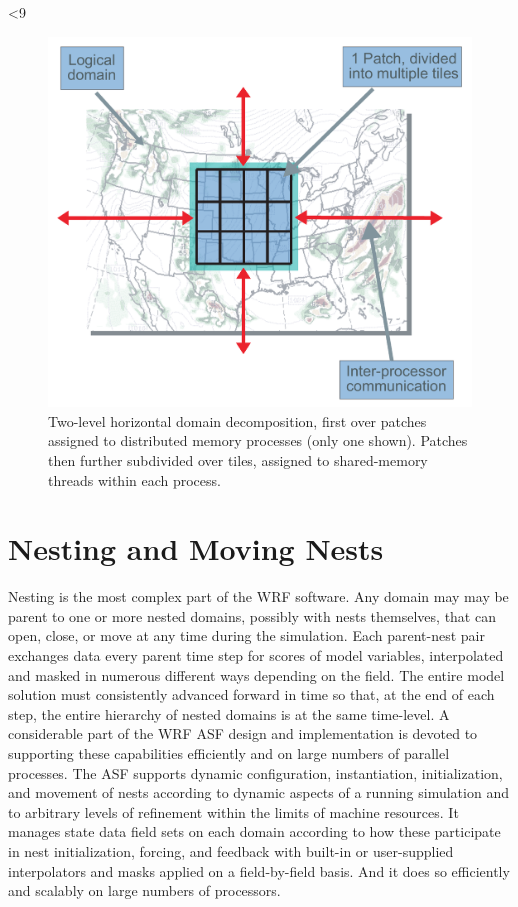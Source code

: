 %
%
\ifnum{}<9
\begin{figure}
  \centering
  \includegraphics[width=6.5in]{figures/tile_patch.pdf}
  \caption{\label{figure:decomposition}Two-level horizontal domain decomposition, first over patches assigned to
distributed memory processes (only one shown). Patches then further subdivided over tiles, assigned to shared-memory threads
within each process.}
\end{figure}
\fi

\section{Nesting and Moving Nests}
\label{arch:2}

Nesting is the most complex
part of the WRF software.  Any domain may may be
parent to one or more nested domains, possibly with nests themselves, that can open, close, or move
at any time during the simulation.  Each
parent-nest pair exchanges data every parent time step for scores of model
variables, interpolated and masked in numerous different ways depending
on the field.  The entire model solution must consistently advanced
forward in time so that, at the end of each step, the entire hierarchy
of nested domains is at the same time-level.  A considerable part of
the WRF ASF design and implementation is devoted to supporting these
capabilities efficiently and on large numbers of parallel processes.
The ASF supports dynamic
configuration, instantiation, initialization, and movement of nests
according to dynamic aspects of a running simulation and to arbitrary
levels of refinement within the limits of machine resources. It manages
state data field sets on each domain according to how these participate
in nest initialization, forcing, and feedback with built-in or
user-supplied interpolators and masks applied on a field-by-field basis.
And it does so efficiently and scalably on large numbers of
processors.

